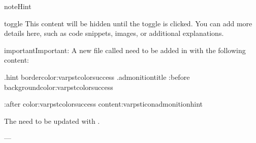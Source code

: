 \documentclass[a4paper,10pt,english]{sphinxmanual}
\begin{document}
\begin{sphinxadmonition}{note}{Hint}

\begin{sphinxuseclass}{toggle}
\sphinxAtStartPar
This content will be hidden until the toggle is clicked. You can add more details here, such as code snippets, images, or additional explanations.

\end{sphinxuseclass}\end{sphinxadmonition}

\begin{sphinxadmonition}{important}{Important:}
\sphinxAtStartPar
A new file called  need to be added in  with the following content:

\begin{sphinxVerbatim}[commandchars=\\\{\}]
.hint
border\PYGZhy{}color:var\PYGZhy{}\PYGZhy{}pst\PYGZhy{}color\PYGZhy{}success
\PYGZgt{}.admonition\PYGZhy{}title
:before
background\PYGZhy{}color:var\PYGZhy{}\PYGZhy{}pst\PYGZhy{}color\PYGZhy{}success

:after
color:var\PYGZhy{}\PYGZhy{}pst\PYGZhy{}color\PYGZhy{}success
content:var\PYGZhy{}\PYGZhy{}pst\PYGZhy{}icon\PYGZhy{}admonition\PYGZhy{}hint
\end{sphinxVerbatim}

\sphinxAtStartPar
The  need to be updated with .
\end{sphinxadmonition}

\sphinxAtStartPar
—
\end{document}
